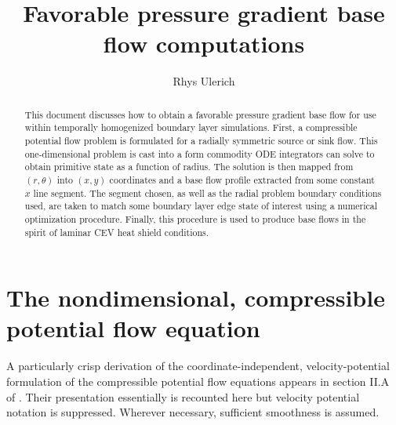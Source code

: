 \documentclass[letterpaper,11pt,nointlimits,reqno]{amsart}
\begin{document}
\title{Favorable pressure gradient base flow computations}
\author{Rhys Ulerich}

\begin{abstract}
This document discusses how to obtain a favorable pressure gradient base flow
for use within temporally homogenized boundary layer simulations.  First, a
compressible potential flow problem is formulated for a radially symmetric
source or sink flow.  This one-dimensional problem is cast into a form
commodity ODE integrators can solve to obtain primitive state as a function of
radius.  The solution is then mapped from $\left(r,\theta\right)$ into
$\left(x,y\right)$ coordinates and a base flow profile extracted from some constant
$x$ line segment.  The segment chosen, as well as the radial problem boundary
conditions used, are taken to match some boundary layer edge state of interest
using a numerical optimization procedure.  Finally, this procedure is used
to produce base flows in the spirit of laminar CEV heat shield conditions.
\end{abstract}

\maketitle

\tableofcontents

\section{The nondimensional, compressible potential flow equation}

A particularly crisp derivation of the coordinate-independent,
velocity-potential formulation of the compressible potential flow equations
appears in section II.A of \citet{Saad2011Coordinate}.  Their presentation
essentially is recounted here but velocity potential notation is suppressed.
Wherever necessary, sufficient smoothness is assumed.
\end{document}
